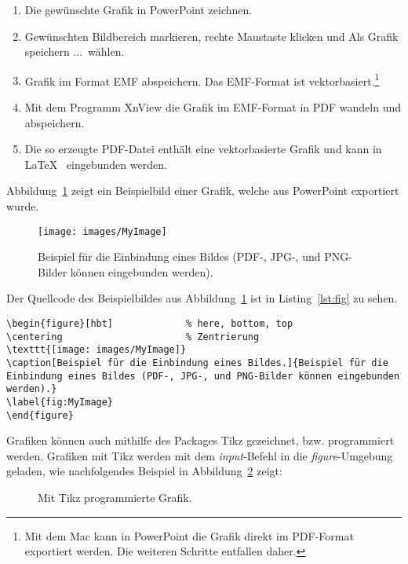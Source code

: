 \begin{enumerate}
	\item Die gewünschte Grafik in PowerPoint zeichnen.
	\item Gewünschten Bildbereich markieren, rechte Maustaste klicken und \glqq Als Grafik speichern ...\grqq~wählen.
	\item Grafik im Format EMF abspeichern. Das EMF-Format ist vektorbasiert.\footnote{Mit dem Mac kann in PowerPoint die Grafik direkt im PDF-Format exportiert werden. Die weiteren Schritte entfallen daher.}
	\item Mit dem Programm XnView die Grafik im EMF-Format in PDF wandeln und abspeichern.
	\item Die so erzeugte PDF-Datei enthält eine vektorbasierte Grafik und kann in \LaTeX~ eingebunden werden.
\end{enumerate}

Abbildung~\ref{fig:MyImage} zeigt ein Beispielbild einer Grafik, welche aus PowerPoint exportiert wurde.

\begin{figure}[hbt]
	\centering
	\texttt{[image: images/MyImage]}
	\caption[Beispiel für die Einbindung eines Bildes.]{Beispiel für die Einbindung eines Bildes (PDF-, JPG-, und PNG-Bilder können eingebunden werden).}
	\label{fig:MyImage}
\end{figure}

Der Quellcode des Beispielbildes aus Abbildung~\ref{fig:MyImage} ist in Listing~\ref{lst:fig} zu sehen.

\clearpage

\begin{lstlisting}[caption=Quellcode der Abbildung~\ref{fig:MyImage}.,label=lst:fig]
\begin{figure}[hbt]				% here, bottom, top
\centering						% Zentrierung
\texttt{[image: images/MyImage]}		
\caption[Beispiel für die Einbindung eines Bildes.]{Beispiel für die Einbindung eines Bildes (PDF-, JPG-, und PNG-Bilder können eingebunden werden).}
\label{fig:MyImage}
\end{figure}
\end{lstlisting}

Grafiken können auch mithilfe des Packages Tikz gezeichnet, bzw. programmiert werden. Grafiken mit Tikz werden mit dem \textit{input}-Befehl in die \textit{figure}-Umgebung geladen, wie nachfolgendes Beispiel in Abbildung~\ref{fig:tikz_house} zeigt:

\begin{figure}[hbt]
	\centering
	
	\caption[Mit Tikz programmierte Grafik.]{Mit Tikz programmierte Grafik.}
	\label{fig:tikz_house}
\end{figure}

